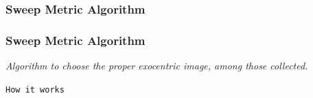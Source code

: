 \subsubsection{Sweep Metric Algorithm}
\frame
{
  \frametitle{Sweep Metric Algorithm}
  
  \emph{Algorithm to choose the proper \textit{exocentric} image,
    among those collected.}
  \pause

  \begin{block} {\alert{\texttt{How it works}}}
 

    \begin{columns}
      
       {   
        }
\end{columns}
\end{block}}
